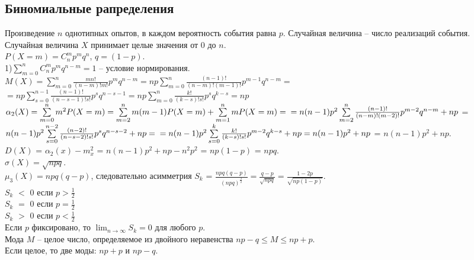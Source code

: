 \documentclass[russian, 12pt, fleqn]{article}
\begin{document}
\subsection{Биномиальные рапределения}
\noindent
Произведение $n$ однотипных опытов, в каждом вероятность события равна $p$. Случайная величина -- число реализаций события.\\
Случайная величина $X$ принимает целые значения от $0$ до $n$.\\
$P(X=m)=C^m_np^mq^n$, $q  = (1 - p)$.\\
1)$\sum\limits_{m=0}^{n}C_n^mp^mq^{n-m} = 1$ -- условие нормирования.\\
$\displaystyle{M(X) = \sum\limits_{m=0}^{n} \frac{mn!}{(n-m)!m!}p^mq^{n-m}= np\sum\limits_{m=0}^{n}\frac{(n-1)!}{(n-m)!(m-1)!}p^{m-1}q^{n-m} =}$\\$= np\sum\limits_{s=0}^{n - 1} \frac{(n-1)!}{(n-s-1)!s!}p^sq^{n-s-1} = np\sum\limits_{m=0}^{n}\frac{k!}{(k-s)!s!}p^sq^{k-s} = np$\\
$\alpha_2(X)=\sum\limits_{m=0}^{n}m^2P(X=m) = \sum\limits_{m=2}^{n} m(m-1)P(X=m) + \sum\limits_{m=1}^{n}mP(X=m)=\\= n(n-1)p^2\sum\limits_{m=2}^{n}\frac{(n-1)!}{(n-m)!(m-2)!}p^{m-2}q^{n-m} + np$ = $n(n-1)p^2\sum\limits_{s=0}^{n-2}\frac{(n-2)!}{(n-s-2)!s!}p^sq^{n-s-2}+np =\\= n(n-1)p^2\sum\limits_{s = 0}^{k}\frac{k!}{(k-s)!s!}p^{m-2}q^{k-s} + np = n(n-1)p^2 + np$ = $n(n-1)p^2 + np$.\\
$D(X)$ = $\alpha_2(x) - m_x^2$ =  $n(n - 1)p^2 + np - n^2p^2$ = $np(1-p)$ = $npq$.\\
$\sigma(X) = \sqrt{npq}$.\\
$\mu_3(X) = npq(q-p)$, следовательно асимметрия $S_k$ = $\frac{npq(q-p)}{(npq)^{\frac{3}{2}}} = \frac{q-p}{\sqrt{npq}} = \frac{1-2p}{\sqrt{np(1-p)}}$.\\
$S_k$ $<$ $0$ если $p>\frac{1}{2}$\\
$S_k$ $=$ $0$ если $p=\frac{1}{2}$\\
$S_k$ $>$ $0$ если $p<\frac{1}{2}$\\
Если $p$ фиксировано, то $\displaystyle{ \lim_{n \to{ \infty}}}S_k = 0$ для любого $p$.\\
Мода $M$ -- целое число, определяемое из двойного неравенства $np-q \leq M \leq np + p$.\\
Если целое, то две моды: $np+p$ и $np-q$.\\
\end{document}
